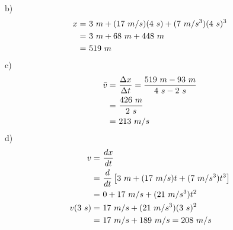 	b)
	\begin{align}
		x = \ &3 \ m + (17 \ m/s)(4 \ s) + (7 \ m/s^{3})(4 \ s)^{3}& \notag \\
		= \ &3 \ m + 68 \ m + 448 \ m& \notag \\
		= \ &519 \ m& \notag
	\end{align}
	c)
	\begin{align}
		\bar{v} = \ &\frac{\Delta x}{\Delta t} = \frac{519 \ m - 93 \ m}{4 \ s - 2 \ s}& \notag \\
		= \ &\frac{426 \ m}{2 \ s}& \notag \\
		= \ &213 \ m/s& \notag
	\end{align}
	d)
	\begin{align}
		v = \ &\frac{dx}{dt}& \notag \\
		= \ &\frac{d}{dt}\left[ 3 \ m + (17 \ m/s)t + (7 \ m/s^{3})t^{3} \right] \notag \\
		= \ &0 + 17 \ m/s + (21 \ m/s^{3})t^{2}& \notag \\
		v(3 \ s) = \ &17 \ m/s + (21 \ m/s^{3})(3 \ s)^{2}& \notag \\
		= \ &17 \ m/s + 189 \ m/s = 208 \ m/s& \notag
	\end{align}
